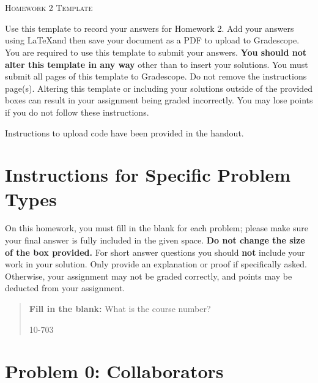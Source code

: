 \documentclass[12pt]{article}
\begin{document}
\section*{}
\begin{center}
  \centerline{\textsc{\LARGE  Homework 2 Template}}
\end{center}

Use this template to record your answers for Homework 2.  Add your answers using \LaTeX and then save your document as a PDF to upload to Gradescope.  You are required to use this template to submit your answers.  \textbf{You should not alter this template in any way} other than to insert your solutions.  You must submit all \pageref{LastPage} pages of this template to Gradescope.  Do not remove the instructions page(s).  Altering this template or including your solutions outside of the provided boxes can result in your assignment being graded incorrectly.  You may lose points if you do not follow these instructions.

Instructions to upload code have been provided in the handout.

\section*{Instructions for Specific Problem Types}

On this homework, you must fill in the blank for each problem; please make sure your final answer is fully included in the given space.  \textbf{Do not change the size of the box provided.}  For short answer questions you should \textbf{not} include your work in your solution.  Only provide an explanation or proof if specifically asked.  Otherwise, your assignment may not be graded correctly, and points may be deducted from your assignment.

\begin{quote}
\textbf{Fill in the blank:} What is the course number?

\begin{tcolorbox}[fit,height=1cm, width=4cm, blank, borderline={1pt}{-2pt},valign=center,nobeforeafter]
    \begin{center}\huge10-703\end{center}
    \end{tcolorbox}
\end{quote}

\newpage

\section*{Problem 0: Collaborators}
\end{document}
